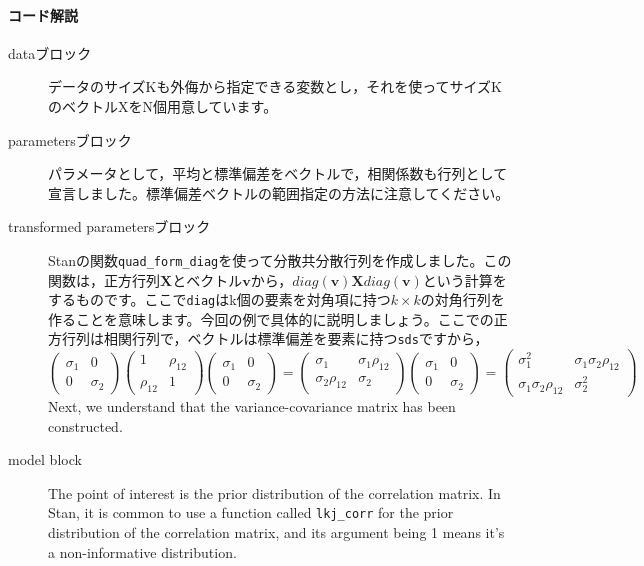 \documentclass{ltjsbook}
\begin{document}
\paragraph{コード解説}
\begin{description}
	\item[dataブロック] データのサイズKも外侮から指定できる変数とし，それを使ってサイズKのベクトルXをN個用意しています。
	\item[parametersブロック] パラメータとして，平均と標準偏差をベクトルで，相関係数も行列として宣言しました。標準偏差ベクトルの範囲指定の方法に注意してください。
	\item[transformed parametersブロック] Stanの関数\verb|quad_form_diag|を使って分散共分散行列を作成しました。この関数は，正方行列$\bm{X}$とベクトル$\bm{v}$から，$diag(\bm{v}) \bm{X} diag(\bm{v})$という計算をするものです。ここで\verb|diag|はk個の要素を対角項に持つ$k \times k$の対角行列を作ることを意味します。今回の例で具体的に説明しましょう。ここでの正方行列は相関行列で，ベクトルは標準偏差を要素に持つ\verb|sds|ですから，
	      \[ \begin{pmatrix}\sigma_1&0\\0&\sigma_2\end{pmatrix}\begin{pmatrix}1&\rho_{12}\\\rho_{12}&1\end{pmatrix}\begin{pmatrix}\sigma_1&0\\0&\sigma_2\end{pmatrix} =
		      \begin{pmatrix} \sigma_1 & \sigma_1\rho_{12}\\ \sigma_2\rho_{12} & \sigma_2\end{pmatrix}\begin{pmatrix}\sigma_1 & 0\\ 0 & \sigma_2\end{pmatrix} =
		      \begin{pmatrix}\sigma_1^2 & \sigma_1\sigma_2\rho_{12} \\ \sigma_1\sigma_2\rho_{12} & \sigma_2^2\end{pmatrix} \]
	      Next, we understand that the variance-covariance matrix has been constructed.
	\item[model block] The point of interest is the prior distribution of the correlation matrix. In Stan, it is common to use a function called \verb|lkj_corr| for the prior distribution of the correlation matrix, and its argument being 1 means it's a non-informative distribution.

\end{description}
\end{document}
